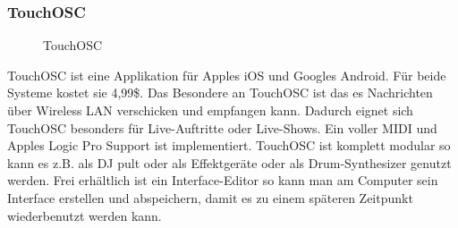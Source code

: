 \documentclass[a4paper, 12pt]{article}
\begin{document}
\subsubsection{TouchOSC}
\begin{figure}[!htb]
  \centering
  \caption[TouchOSC \cite{touchosc}]{TouchOSC}
  \label{fig:touchosc}
\end{figure}
TouchOSC ist eine Applikation für Apples iOS und Googles Android. Für beide Systeme kostet sie 4,99\$. Das Besondere an TouchOSC ist das es Nachrichten über Wireless LAN verschicken und empfangen kann. Dadurch eignet sich TouchOSC besonders für Live-Auftritte oder Live-Shows. Ein voller MIDI und Apples Logic Pro Support ist implementiert. TouchOSC ist komplett modular so kann es z.B. als DJ pult oder als Effektgeräte oder als Drum-Synthesizer genutzt werden. Frei erhältlich ist ein Interface-Editor so kann man am Computer sein Interface erstellen und abspeichern, damit es zu einem späteren Zeitpunkt wiederbenutzt werden kann.
\newpage
\renewcommand{\refname}{REFERENCES}



\listoffigures
\end{document}
